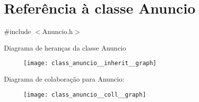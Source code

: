 \hypertarget{class_anuncio}{\section{Referência à classe Anuncio}
\label{class_anuncio}
}


{\ttfamily \#include $<$Anuncio.\+h$>$}



Diagrama de heranças da classe Anuncio\nopagebreak
\begin{figure}[H]
\begin{center}
\leavevmode
\texttt{[image: class\_anuncio\_\_inherit\_\_graph]}
\end{center}
\end{figure}


Diagrama de colaboração para Anuncio\+:\nopagebreak
\begin{figure}[H]
\begin{center}
\leavevmode
\texttt{[image: class\_anuncio\_\_coll\_\_graph]}
\end{center}
\end{figure}
